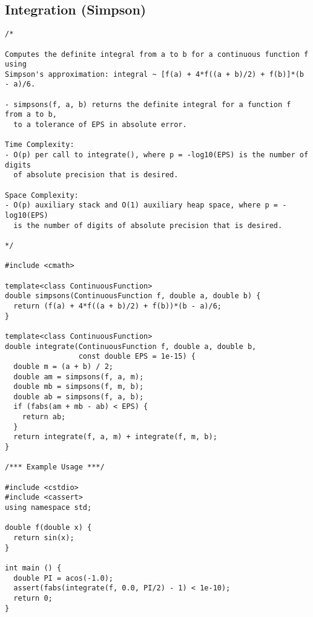 \subsection{Integration (Simpson)}
\begin{lstlisting}
/*

Computes the definite integral from a to b for a continuous function f using
Simpson's approximation: integral ~ [f(a) + 4*f((a + b)/2) + f(b)]*(b - a)/6.

- simpsons(f, a, b) returns the definite integral for a function f from a to b,
  to a tolerance of EPS in absolute error.

Time Complexity:
- O(p) per call to integrate(), where p = -log10(EPS) is the number of digits
  of absolute precision that is desired.

Space Complexity:
- O(p) auxiliary stack and O(1) auxiliary heap space, where p = -log10(EPS)
  is the number of digits of absolute precision that is desired.

*/

#include <cmath>

template<class ContinuousFunction>
double simpsons(ContinuousFunction f, double a, double b) {
  return (f(a) + 4*f((a + b)/2) + f(b))*(b - a)/6;
}

template<class ContinuousFunction>
double integrate(ContinuousFunction f, double a, double b,
                 const double EPS = 1e-15) {
  double m = (a + b) / 2;
  double am = simpsons(f, a, m);
  double mb = simpsons(f, m, b);
  double ab = simpsons(f, a, b);
  if (fabs(am + mb - ab) < EPS) {
    return ab;
  }
  return integrate(f, a, m) + integrate(f, m, b);
}

/*** Example Usage ***/

#include <cstdio>
#include <cassert>
using namespace std;

double f(double x) {
  return sin(x);
}

int main () {
  double PI = acos(-1.0);
  assert(fabs(integrate(f, 0.0, PI/2) - 1) < 1e-10);
  return 0;
}
\end{lstlisting}
